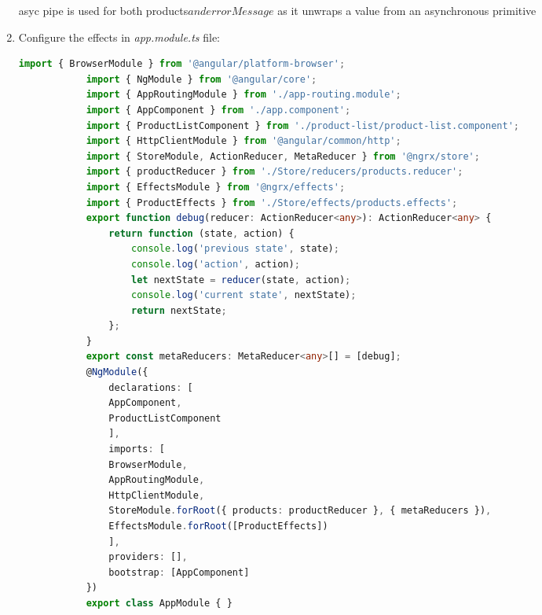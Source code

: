 \documentclass{report}
\begin{document}
\begin{enumerate}
\begin{lstlisting}[language=HTML, caption=product-list.component.html]
\end{lstlisting}
asyc pipe is used for both products$ and errorMessage$ as it unwraps a value from an asynchronous primitive

\item{Configure the effects in \textit{app.module.ts} file:}
		\begin{lstlisting}[caption=app.module.ts, language=Typescript]
			import { BrowserModule } from '@angular/platform-browser';
			import { NgModule } from '@angular/core';
			import { AppRoutingModule } from './app-routing.module';
			import { AppComponent } from './app.component';
			import { ProductListComponent } from './product-list/product-list.component';
			import { HttpClientModule } from '@angular/common/http';
			import { StoreModule, ActionReducer, MetaReducer } from '@ngrx/store';
			import { productReducer } from './Store/reducers/products.reducer';
			import { EffectsModule } from '@ngrx/effects';
			import { ProductEffects } from './Store/effects/products.effects';
			export function debug(reducer: ActionReducer<any>): ActionReducer<any> {
				return function (state, action) {
					console.log('previous state', state);
					console.log('action', action);
					let nextState = reducer(state, action);
					console.log('current state', nextState);
					return nextState;
				};
			}
			export const metaReducers: MetaReducer<any>[] = [debug];
			@NgModule({
				declarations: [
				AppComponent,
				ProductListComponent
				],
				imports: [
				BrowserModule,
				AppRoutingModule,
				HttpClientModule,
				StoreModule.forRoot({ products: productReducer }, { metaReducers }),
				EffectsModule.forRoot([ProductEffects])
				],
				providers: [],
				bootstrap: [AppComponent]
			})
			export class AppModule { }


\end{lstlisting}
\end{enumerate}
\end{document}
